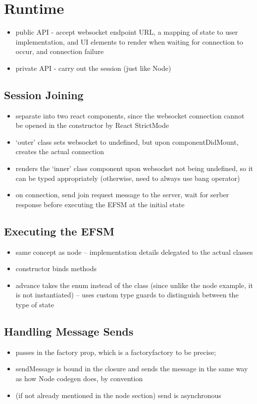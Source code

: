 \section{Runtime}
\begin{itemize}
\item public API - accept websocket endpoint URL, a mapping of state to user implementation, and UI elements to render when waiting for connection to occur, and connection failure
\item private API - carry out the session (just like Node)
\end{itemize}

\subsection{Session Joining}
\begin{itemize}
\item separate into two react components, since the websocket connection cannot be opened in the constructor by React StrictMode
\item `outer' class sets websocket to undefined, but upon componentDidMount, creates the actual connection
\item renders the `inner' class component upon websocket not being undefined, so it can be typed appropriately (otherwise, need to always use bang operator)
\item on connection, send join request message to the server, wait for serber response before executing the EFSM at the initial state
\end{itemize}

\subsection{Executing the EFSM}
\begin{itemize}
\item same concept as node -- implementation details delegated to the actual classes
\item constructor binds methods
\item advance takes the enum instead of the class (since unlike the node example, it is not instantiated) -- uses custom type guards to distinguish between the type of state
\end{itemize}

\subsection{Handling Message Sends}
\begin{itemize}
\item passes in the factory prop, which is a factoryfactory to be precise;
\item sendMessage is bound in the closure and sends the message in the same way as how Node codegen does, by convention
\item (if not already mentioned in the node section) send is asynchronous
\end{itemize}

